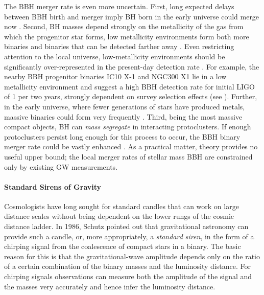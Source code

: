 The BBH merger rate is even more uncertain.  First, long expected delays 
between BBH birth and merger imply BH born in the early universe could merge 
now \cite{PSellipticals}.
%
Second, BH masses depend strongly on the metallicity of the gas from which 
the progenitor star forms, low metallicity environments form both more
binaries and binaries that can be detected farther away
\cite{popsyn-MaxMassBH-Chris2009,popsyn-LowMetallicityImpact-Chris2008}.
Even restricting attention to the local universe, low-metallicity environments
should be significantly over-represented in the present-day detection rate
\cite{popsyn-LIGO-SFR-2008}.
For example, the nearby BBH progenitor binaries IC10 X-1 and NGC300 X1 lie in a low
metallicity environment and suggest a high BBH detection rate for initial 
LIGO of 1 per two years, strongly dependent on survey selection effects (see 
\cite{bhrates-Chris-IC10-2008}).
Further, in the early universe, where fewer generations of stars have produced metals, 
massive binaries could form very frequently
\cite{popsyn-LowMetallicityImpact-Chris2008}.
Third, being the most massive compact objects, BH can \emph{mass segregate} in 
interacting protoclusters. If enough protoclusters persist long enough for this 
process to occur, the BBH binary merger rate could be vastly enhanced 
\cite{clusters-2005,2008ApJ...676.1162S, PZMcM}.
%
As a practical matter, theory provides no useful upper bound; the 
local merger rates of stellar mass
BBH are constrained only by existing GW measurements. 


\paragraph{Standard Sirens of Gravity}

Cosmologists have long sought for standard candles that can
work on large distance scales without being dependent on the
lower rungs of the cosmic distance ladder. In 1986, Schutz \cite{Schutz86}
pointed out that gravitational astronomy can
provide such a candle, or, more appropriately, a {\em standard
siren}, in the form of a chirping signal from the coalescence
of compact stars in a binary.
The basic reason for this is that the gravitational-wave
amplitude depends only on the ratio of a certain combination of the
binary masses and the luminosity distance. For chirping signals
observations can measure both the amplitude of the signal and
the masses very accurately and hence infer the luminosity distance.

